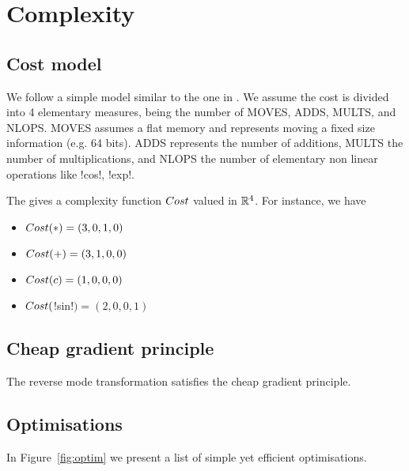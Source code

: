\section{Complexity}
\label{sec:complexity}

\subsection{Cost model}

We follow a simple model similar to the one in \cite{griewank2008evaluating}.
We assume the cost is divided into 4 elementary measures, being the number of MOVES, ADDS, MULTS, and NLOPS.
MOVES assumes a flat memory and represents moving a fixed size information  (e.g. 64 bits). 
ADDS represents the number of additions, 
MULTS the number of multiplications, 
and NLOPS the number of elementary non linear operations like !cos!, !exp!.

The gives a complexity function $Cost$ valued in $\mathbb{R}^4$. 
For instance, we have 

\begin{itemize}
    \item $Cost(*)=(3,0,1,0)$
    \item $Cost(+)=(3,1,0,0)$
    \item $Cost(c)=(1,0,0,0)$
    \item $Cost($!sin!$)=(2,0,0,1)$
\end{itemize}



\subsection{Cheap gradient principle}

\begin{theorem}
    The reverse mode transformation satisfies the cheap gradient principle.
\end{theorem}

\subsection{Optimisations} %
\label{sub:Optimisations}

In Figure~\ref{fig:optim} we present a list of simple yet efficient optimisations.

